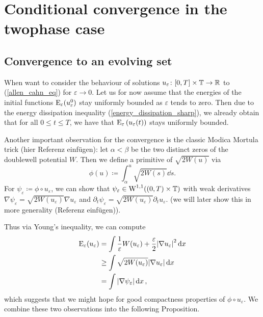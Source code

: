 \section{Conditional convergence in the twophase case}

\subsection{Convergence to an evolving set}

When want to consider the behaviour of solutions $ u_{ \varepsilon} \colon [0, T] \times \operatorname{\mathbb{T}} \to \mathbb{ R } $ to (\ref{allen_cahn_eq}) for $ \varepsilon \to 0 $. Let us for now assume that the energies of the initial functions $ \operatorname{E}_{ \varepsilon } ( u_{ \varepsilon }^{ 0 } ) $ stay uniformly bounded as $ \varepsilon $ tends to zero. 
Then due to the energy dissipation inequality (\ref{energy_dissipation_sharp}), we already obtain that for all
$ 0 \leq t \leq T $, we have that $ \operatorname{E}_{ \varepsilon } \left( u_{\varepsilon } ( t ) \right) $ stays uniformly  bounded.

Another important observation for the convergence is the classic Modica Mortula trick (hier Referenz einfügen): let $ \alpha < \beta $ be the two distinct zeros of the doublewell potential $ W $.
Then we define a primitive of $ \sqrt{ 2 W ( u ) } $ via
\begin{equation*}
	\phi ( u ) 
	\coloneqq
	\int_{ \alpha }^{ u }
	\sqrt{ 2 W ( s ) }
	\dd{ s }.
\end{equation*}
For $ \psi_{ \varepsilon } \coloneqq \phi \circ u_{ \varepsilon } $, we can show that $ \psi_{ \varepsilon } \in \operatorname{W}^{ 1, 1 } ( ( 0 , T ) \times \operatorname{\mathbb{T}} ) $ with weak derivatives $ \nabla \psi_{ \varepsilon } = \sqrt{ 2 W ( u_{ \varepsilon } ) } \nabla u_{ \varepsilon } $ and $ \partial_{ t } \psi_{ \varepsilon } = \sqrt{ 2 W ( u_{ \varepsilon } ) } \partial_{ t } u_{ \varepsilon } $. (we will later show this in more generality (Referenz einfügen)).

Thus via Young's inequality, we can compute
\begin{align}
	\operatorname{E}_{ \varepsilon } ( u_{ \varepsilon } )
	& =
	\int
	\frac{ 1 }{ \varepsilon }
	W ( u_{ \varepsilon } ) 
	+
	\frac{ \varepsilon }{ 2 }
	\abs{ \nabla u_{ \varepsilon } }^{ 2 }
	\dd{ x }
	\notag
	\\
	& \geq
	\int
	\sqrt{ 2 W ( u_{ \varepsilon } ) }
	\abs{ \nabla u_{ \varepsilon } }
	\dd{ x }
	\notag
	\\
	& =
	\int
	\abs{ \nabla \psi_{ \varepsilon} }
	\dd{ x }
	\label{modica_mortula_trick},
\end{align}
which suggests that we might hope for good compactness properties of $ \phi \circ u_{ \varepsilon } $.
We combine these two observations into the following Proposition.

